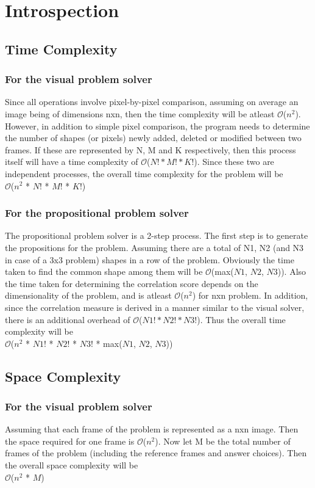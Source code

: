 \documentclass[10pt, letter]{article}
\newcommand{\bigO}{\ensuremath{\mathcal{O}}}
\begin{document}
\section{Introspection}
\subsection*{Time Complexity}
\subsubsection*{For the visual problem solver}
Since all operations involve pixel-by-pixel comparison, assuming on average an image being of dimensions nxn, then the time complexity will be atleast \bigO{($n^2$)}. However, in addition to simple pixel comparison, the program needs to determine the number of shapes (or pixels) newly added, deleted or modified between two frames. If these are represented by N, M and K respectively, then this process itself will have a time complexity of \bigO{($N! * M! * K!$)}. Since these two are independent processes, the overall time complexity for the problem will be \\
\hspace*{3cm}\bigO{($n^2$ * $N!$ * $M!$ * $K!$)}
\subsubsection*{For the propositional problem solver}
The propositional problem solver is a 2-step process. The first step is to generate the propositions for the problem. Assuming there are a total of N1, N2 (and N3 in case of a 3x3 problem) shapes in a row of the problem. Obviously the time taken to find the common shape among them will be \bigO{(max($N1$, $N2$, $N3$))}. Also the time taken for determining the correlation score depends on the dimensionality of the problem, and is atleast \bigO{($n^2$)} for nxn problem. In addition, since the correlation measure is derived in a manner similar to the visual solver, there is an additional overhead of \bigO{($N1! * N2! * N3!$)}. Thus the overall time complexity will be \\
\hspace*{3cm}\bigO{($n^2$ * $N1!$ * $N2!$ * $N3!$ * max($N1$, $N2$, $N3$))}

\subsection*{Space Complexity}
\subsubsection*{For the visual problem solver}
Assuming that each frame of the problem is represented as a nxn image. Then the space required for one frame is \bigO{($n^2$)}. Now let M be the total number of frames of the problem (including the reference frames and answer choices). Then the overall space complexity will be \\
\hspace*{3cm}\bigO{($n^2$ * $M$)}
\end{document}

